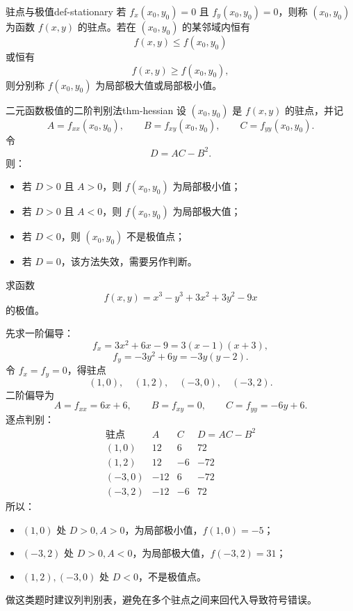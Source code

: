 \begin{dy}{驻点与极值}{def-stationary}
若 $f_x(x_0,y_0)=0$ 且 $f_y(x_0,y_0)=0$，则称 $(x_0,y_0)$ 为函数 $f(x,y)$ 的驻点。若在 $(x_0,y_0)$ 的某邻域内恒有
\[
  f(x,y)\le f(x_0,y_0)
\]
或恒有
\[
  f(x,y)\ge f(x_0,y_0),
\]
则分别称 $f(x_0,y_0)$ 为局部极大值或局部极小值。
\end{dy}

\begin{dl}{二元函数极值的二阶判别法}{thm-hessian}
设 $(x_0,y_0)$ 是 $f(x,y)$ 的驻点，并记
\[
  A=f_{xx}(x_0,y_0),\qquad
  B=f_{xy}(x_0,y_0),\qquad
  C=f_{yy}(x_0,y_0).
\]
令
\[
  D=AC-B^2.
\]
则：
\begin{itemize}
  \item 若 $D>0$ 且 $A>0$，则 $f(x_0,y_0)$ 为局部极小值；
  \item 若 $D>0$ 且 $A<0$，则 $f(x_0,y_0)$ 为局部极大值；
  \item 若 $D<0$，则 $(x_0,y_0)$ 不是极值点；
  \item 若 $D=0$，该方法失效，需要另作判断。
\end{itemize}
\end{dl}

\begin{problem}
求函数
\[
  f(x,y)=x^3-y^3+3x^2+3y^2-9x
\]
的极值。
\end{problem}
\begin{solution}
先求一阶偏导：
\[
  f_x=3x^2+6x-9=3(x-1)(x+3),
\]
\[
  f_y=-3y^2+6y=-3y(y-2).
\]
令 $f_x=f_y=0$，得驻点
\[
  (1,0),\quad (1,2),\quad (-3,0),\quad (-3,2).
\]
二阶偏导为
\[
  A=f_{xx}=6x+6,\qquad B=f_{xy}=0,\qquad C=f_{yy}=-6y+6.
\]
逐点判别：
\[
\begin{array}{c|c|c|c}
\text{驻点} & A & C & D=AC-B^2\\ \hline
(1,0)&12&6&72\\
(1,2)&12&-6&-72\\
(-3,0)&-12&6&-72\\
(-3,2)&-12&-6&72
\end{array}
\]
所以：
\begin{itemize}
  \item $(1,0)$ 处 $D>0,A>0$，为局部极小值，$f(1,0)=-5$；
  \item $(-3,2)$ 处 $D>0,A<0$，为局部极大值，$f(-3,2)=31$；
  \item $(1,2),(-3,0)$ 处 $D<0$，不是极值点。
\end{itemize}
\end{solution}
\begin{note}
做这类题时建议列判别表，避免在多个驻点之间来回代入导致符号错误。
\end{note}

